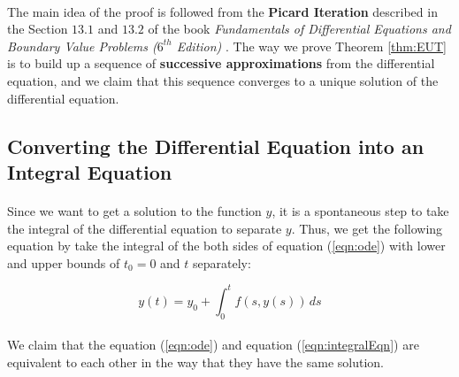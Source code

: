 \documentclass{article}
\theoremstyle{definition}
\theoremstyle{remark}
\begin{document}
\paragraph{  }

The main idea of the proof is followed from the \textbf{Picard Iteration} described in the Section $13.1$ and $13.2$ of the book \textit{Fundamentals of Differential Equations and Boundary Value Problems ($6^{th}$ Edition)} \cite{r_kent_nagle_fundamentals_2011}. The way we prove Theorem \ref{thm:EUT} is to build up a sequence of \textbf{successive approximations} from the differential equation, and we claim that this sequence converges to a unique solution of the differential equation.

\subsection{Converting the Differential Equation into an Integral Equation}

\paragraph{  }

Since we want to get a solution to the function $y$, it is a spontaneous step to take the integral of the differential equation to separate $y$. Thus, we get the following equation by take the integral of the both sides of equation (\ref{eqn:ode}) with lower and upper bounds of $t_0 = 0$ and $t$ separately:

\begin{equation}\label{eqn:integralEqn}
    y(t) = y_0 + \int_{0}^{t} f(s,y(s))\,ds
\end{equation}

\paragraph{  }

We claim that the equation (\ref{eqn:ode}) and equation (\ref{eqn:integralEqn}) are equivalent to each other in the way that they have the same solution. 
\end{document}
